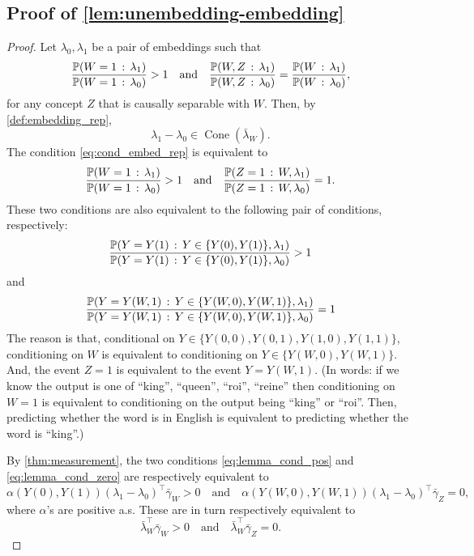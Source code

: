\documentclass{article}
\theoremstyle{plain}
\theoremstyle{definition}
\theoremstyle{remark}
\DeclareMathOperator{\ConeOp}{Cone}
\newcommand{\Cone}[1]{\ConeOp(#1)}
\begin{document}
\subsection{Proof of \cref{lem:unembedding-embedding}}
\UnembeddingEmbedding*
\begin{proof}
    Let $\lambda_0,\lambda_1$ be a pair of embeddings such that
    \begin{equation}\label{eq:cond_embed_rep}
        \frac{\Pr(W=1 \given \lambda_1)}{\Pr(W=1\given \lambda_0)}>1 \quad\text{and}\quad \frac{\Pr(W,Z \given \lambda_1)}{\Pr(W, Z \given \lambda_0)} = \frac{\Pr(W \given \lambda_1)}{\Pr(W \given \lambda_0)},
    \end{equation}
    for any concept $Z$ that is causally separable with $W$. Then, by \cref{def:embedding_rep},
    \begin{equation}
        \lambda_1 - \lambda_0\in \Cone{\bar{\lambda}_W}.
    \end{equation}
    The condition \eqref{eq:cond_embed_rep} is equivalent to
    \begin{align}
        \frac{\Pr(W=1 \given \lambda_1)}{\Pr(W = 1 \given \lambda_0)} > 1 \quad \text{and}\quad \frac{\Pr(Z = 1 \given W,\lambda_1)}{\Pr(Z = 1 \given W, \lambda_0)} = 1. \label{relationship}
    \end{align}
    These two conditions are also equivalent to the following pair of conditions, respectively:
    \begin{equation}\label{eq:lemma_cond_pos}
        \frac{\Pr(Y=Y(1) \given Y\in\{Y(0), Y(1)\}, \lambda_1)}{\Pr(Y=Y(1) \given Y\in\{Y(0), Y(1)\},\lambda_0)} > 1
    \end{equation}
    and
    \begin{equation}\label{eq:lemma_cond_zero}
        \frac{\Pr(Y=Y(W, 1) \given Y\in\{Y(W,0), Y(W,1)\}, \lambda_1)}{\Pr(Y=Y(W, 1) \given Y\in\{Y(W,0), Y(W,1)\}, \lambda_0)} = 1
    \end{equation}
    The reason is that, conditional on $Y \in \{Y(0,0), Y(0, 1), Y(1, 0), Y(1,1)\}$, conditioning on $W$ is equivalent to conditioning on $Y \in \{Y(W,0), Y(W,1)\}$. And, the event $Z=1$ is equivalent to the event $Y=Y(W,1)$.
    (In words: if we know the output is one of ``king'', ``queen'', ``roi'', ``reine'' then conditioning on $W=1$ is equivalent to conditioning on the output being ``king'' or ``roi''. Then, predicting whether the word is in English is equivalent to predicting whether the word is ``king''.)
    
    By \cref{thm:measurement}, the two conditions \eqref{eq:lemma_cond_pos} and \eqref{eq:lemma_cond_zero} are respectively equivalent to
    \begin{equation}\label{eq:lemma_cond_alpha}
        \alpha(Y(0), Y(1)) (\lambda_1 - \lambda_0)^\top \bar\gamma_W > 0 \quad \text{and}\quad \alpha(Y(W,0), Y(W,1)) (\lambda_1 - \lambda_0)^\top \bar\gamma_Z = 0,
    \end{equation}
    where $\alpha$'s are positive a.s.
    These are in turn respectively equivalent to
    \begin{equation}\label{eq:cond_lemma}
        \bar\lambda_W^\top \bar\gamma_W >0 \quad\text{and}\quad \bar\lambda_W^\top \bar\gamma_Z = 0 .
    \end{equation}
    

\end{proof}
\end{document}
